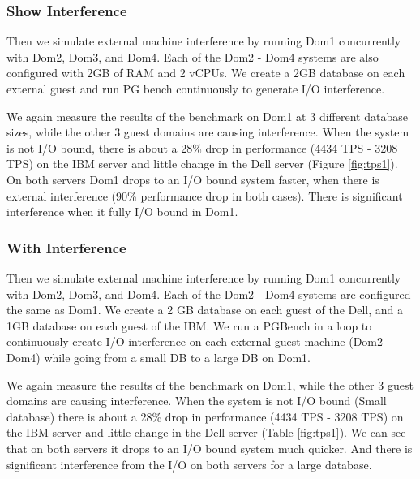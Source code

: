 \subsubsection {Show Interference}
Then we simulate external machine interference by running Dom1 concurrently with Dom2, Dom3, and Dom4. Each of the Dom2 - Dom4 systems are also configured with 2GB of RAM and 2 vCPUs.  We create a 2GB database on each external guest and run PG bench continuously to generate I/O interference.  

 We again measure the results of the benchmark on Dom1 at 3 different database sizes, while the other 3 guest domains are causing interference.  When the system is not I/O bound, there is about a 28\% drop in performance (4434 TPS - 3208 TPS) on the IBM server and little change in the Dell server (Figure \ref{fig:tps1}).  On both servers Dom1 drops to an I/O bound system faster, when there is external interference (90\% performance drop in both cases).  There is significant interference when it fully I/O bound in Dom1.

\subsubsection{With Interference}
Then we simulate external machine interference by running Dom1 concurrently with Dom2, Dom3, and Dom4. Each of the Dom2 - Dom4 systems are configured the same as Dom1.  We create a 2 GB database on each guest of the Dell, and a 1GB database on each guest of the IBM.  We run a PGBench in a loop to continuously create I/O interference on each external guest machine (Dom2 - Dom4) while going from a small DB to a large DB on Dom1.

 We again measure the results of the benchmark on Dom1, while the other 3 guest domains are causing interference.  When the system is not I/O bound (Small database) there is about a 28\% drop in performance (4434 TPS - 3208 TPS) on the IBM server and little change in the Dell server (Table \ref{fig:tps1}).  We can see that on both servers it drops to an I/O bound system much quicker.  And there is significant interference from the I/O on both servers for a large database.

